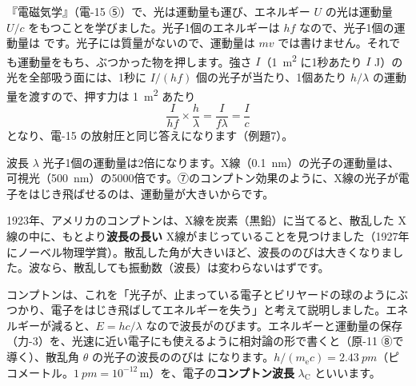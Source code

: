 \label{ph:原-2:sec6}
『電磁気学』（電-15 ⑤）で、光は運動量も運び、エネルギー $U$ の光は運動量 $U/c$ をもつことを学びました。光子1個のエネルギーは $hf$ なので、光子1個の運動量は
\label{ph:原-2:momentum}です。光子には質量がないので、運動量は $mv$ では書けません。それでも運動量をもち、ぶつかった物を押します。強さ $I$（\qty{1}{m^2} に1秒あたり $I$ J）の光を全部吸う面には、1秒に $I/(hf)$ 個の光子が当たり、1個あたり $h/\lambda$ の運動量を渡すので、押す力は \qty{1}{m^2} あたり
\[ \frac{I}{hf}\times\frac{h}{\lambda}=\frac{I}{f\lambda}=\frac{I}{c} \]
となり、電-15 の放射圧と同じ答えになります（例題7）。

\begin{phbaisuru}[半分]{波長 $\lambda$}
光子1個の運動量は2倍になります。X線（\qty{0.1}{nm}）の光子の運動量は、可視光（\qty{500}{nm}）の5000倍です。⑦のコンプトン効果のように、X線の光子が電子をはじき飛ばせるのは、運動量が大きいからです。
\end{phbaisuru}

\label{ph:原-2:sec7}
1923年、アメリカのコンプトンは、X線を炭素（黒鉛）に当てると、散乱した X線の中に、もとより\textbf{波長の長い} X線がまじっていることを見つけました（1927年にノーベル物理学賞）。散乱した角が大きいほど、波長ののびは大きくなりました。波なら、散乱しても振動数（波長）は変わらないはずです。

コンプトンは、これを「光子が、止まっている電子とビリヤードの球のようにぶつかり、電子をはじき飛ばしてエネルギーを失う」と考えて説明しました。エネルギーが減ると、$E=hc/\lambda$ なので波長がのびます。エネルギーと運動量の保存（力-3）を、光速に近い電子にも使えるように相対論の形で書くと（原-11 ⑧で導く）、散乱角 $\theta$ の光子の波長ののびは
\label{ph:原-2:compton}になります。$h/(m_{\mathrm e}c)=\qty{2.43}{pm}$（ピコメートル。$\qty{1}{pm}=10^{-12}$\,m）を、電子の\textbf{コンプトン波長} $\lambda_{\mathrm C}$ といいます。

